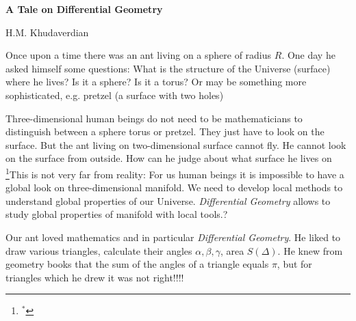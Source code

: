 
   \centerline {\bf A Tale on Differential Geometry}

         \centerline  {H.M. Khudaverdian}

  \bigskip



\def \he {He (She)$\,$}

   Once upon a time there was  an ant living on a sphere of radius $R$.
    One day
   he  asked himself some questions:
   What is the structure of the Universe (surface) where he
   lives?
   Is it a sphere? Is it a torus? Or may be something more
   sophisticated, e.g. pretzel (a surface with two holes)


  Three-dimensional human beings do not need to be mathematicians
  to distinguish between a sphere torus or pretzel.  They just have to look on the surface.
  But the ant living on
  two-dimensional surface cannot fly. He cannot look on the surface
   from outside. How can he judge about what surface he lives on
  \footnote{$^*$}{This is not very far from reality: For us human beings
   it is impossible to have a global look on three-dimensional  manifold.
 We need to develop local methods to understand global properties
 of our Universe. {\it Differential Geometry} allows to study
  global properties of manifold with local tools.}?

  Our ant loved mathematics and in particular {\it Differential Geometry}. He liked to draw various triangles,
   calculate their angles
  $\alpha,\beta,\gamma$, area
  $S(\Delta)$.
   He knew from geometry books that the sum of the angles of
   a triangle equals  $\pi$,
    but for triangles which he drew it was not right!!!!

